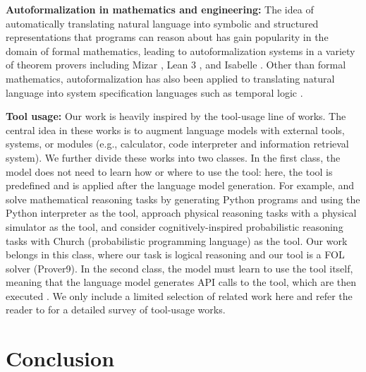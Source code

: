 \documentclass[11pt]{article}
\begin{document}
\textbf{Autoformalization in mathematics and engineering:} The idea of automatically translating natural language into symbolic and structured representations that programs can reason about has gain popularity in the domain of formal mathematics, leading to autoformalization systems in a variety of theorem provers including Mizar \cite{wang2018first, wang2020exploration}, Lean 3 \cite{azerbayev2023proofnet}, and Isabelle \cite{wu2022autoformalization}. Other than formal mathematics, autoformalization has also been applied to translating natural language into system specification languages such as temporal logic \cite{hahn2022formal, cosler2023nl2spec, chen2023nl2tl}.

\textbf{Tool usage:} Our work is heavily inspired by the tool-usage line of works. The central idea in these works is to augment language models with external tools, systems, or modules (e.g., calculator, code interpreter and information retrieval system). We further divide these works into two classes. In the first class, the model does not need to learn how or where to use the tool: here, the tool is predefined and is applied after the language model generation. For example, \citet{gao2023pal} and \citet{drori2022neural} solve mathematical reasoning tasks by generating Python programs and using the Python interpreter as the tool, \citet{liu2022mind} approach physical reasoning tasks with a physical simulator as the tool, and \citet{wong2023word} consider cognitively-inspired probabilistic reasoning tasks with Church (probabilistic programming language) as the tool. Our work belongs in this class, where our task is logical reasoning and our tool is a FOL solver (Prover9). In the second class, the model must learn to use the tool itself, meaning that the language model generates API calls to the tool, which are then executed \citep{schick2023toolformer, thoppilan2022lamda, yao2022react, cheng2022binding}. We only include a limited selection of related work here and refer the reader to \citet{mialon2023augmented} for a detailed survey of tool-usage works.

\section{Conclusion}
\end{document}

